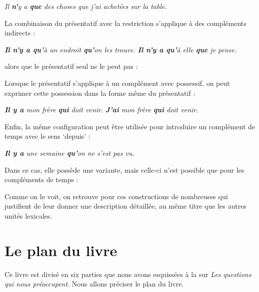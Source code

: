 {   \ea
    \textit{{Il} \textbf{{n’}}{y a} \textbf{{que}} {des choses que j’ai} {achetées} {sur la table.}}
    \z

  \noindent  La combinaison du présentatif avec la restriction s’applique à des compléments indirects :

   \ea
   \ea   \textit{\textbf{{Il n’y} {a qu’}}{à un endroit} \textbf{{qu’}}{on les trouve.}}
   \ex   \textit{\textbf{{Il n’y} {a qu’}}{à elle} \textbf{{que}} {je pense.}}
   \z
   \z

 \noindent  alors que le présentatif seul ne le peut pas :

   \ea
   \z
   \z

  \noindent  Lorsque le présentatif s’applique à un complément avec possessif, on peut exprimer cette possession dans la forme même du présentatif :

   \ea
    \ea \textit{\textbf{{Il y a}} {mon frère} \textbf{{qui}} {doit venir.}}
    \ex \textit{\textbf{{J’ai}} {mon frère} \textbf{{qui}} {doit venir.}}
    \z
    \z

   \noindent Enfin, la même configuration peut être utilisée pour introduire un complément de temps avec le sens ‘depuis’ :

   \ea
    \textit{\textbf{{Il y a}} {une semaine} \textbf{{qu’}}{on ne s’est} {pas vu.}}
    \z

 \noindent   Dans ce cas, elle possède une variante, mais celle-ci n’est possible que pour les compléments de temps :

   \ea
   \z
   \z

   Comme on le voit, on retrouve pour ces constructions de nombreuses  qui justifient de leur donner une description détaillée, au même titre que les autres unités lexicales.}
   
\section{Le plan du livre}\label{sec:0.0.8}

Ce livre est divisé en six parties que nous avons esquissées à la  sur \textit{Les questions qui nous préoccupent}. Nous allons préciser le plan du livre.

